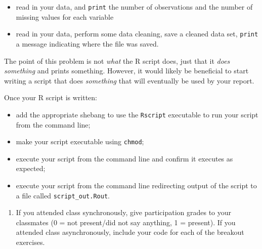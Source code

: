 \documentclass[]{article}
\providecommand{\tightlist}{%
  \setlength{\itemsep}{0pt}\setlength{\parskip}{0pt}}
\begin{document}
\begin{itemize}
\tightlist
\item
  read in your data, and \texttt{print} the number of observations and
  the number of missing values for each variable
\item
  read in your data, perform some data cleaning, save a cleaned data
  set, \texttt{print} a message indicating where the file was saved.
\end{itemize}

The point of this problem is not \emph{what} the R script does, just
that it \emph{does something} and prints something. However, it would
likely be beneficial to start writing a script that does
\emph{something} that will eventually be used by your report.

Once your R script is written:

\begin{itemize}
\tightlist
\item
  add the appropriate shebang to use the \texttt{Rscript} executable to
  run your script from the command line;
\item
  make your script executable using \texttt{chmod};
\item
  execute your script from the command line and confirm it executes as
  expected;
\item
  execute your script from the command line redirecting output of the
  script to a file called \texttt{script\_out.Rout}.
\end{itemize}

\begin{enumerate}
\def\labelenumi{\arabic{enumi}.}
\setcounter{enumi}{2}
\tightlist
\item
  If you attended class synchronously, give participation grades to your
  classmates (0 = not present/did not say anything, 1 = present). If you
  attended class asynchronously, include your code for each of the
  breakout exercises.
\end{enumerate}
\end{document}
